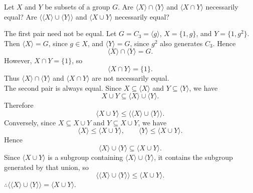\documentclass[../Odyssey_Project.tex]{subfiles}
\begin{document}
\begin{exercise}
\label{ex:1.6}
Let $X$ and $Y$ be subsets of a group $G$. Are $\langle X \rangle \cap \langle Y \rangle$ and $\langle X \cap Y \rangle$ necessarily equal? Are $\langle \langle X \rangle \cup \langle Y \rangle \rangle$ and $\langle X \cup Y \rangle$ necessarily equal?
\end{exercise}
\begin{solution}
The first pair need not be equal. Let \(G = C_3 = \langle g \rangle\), \(X = \{1,g\}\), and \(Y = \{1,g^2\}\). Then \(\langle X\rangle = G\), since \(g \in X\), and \(\langle Y\rangle = G\), since \(g^2\) also generates \(C_3\). Hence
\[
    \langle X\rangle \cap \langle Y\rangle = G.
\]
However, \(X \cap Y = \{1\}\), so
\[
    \langle X \cap Y\rangle = \{1\}.
\]
Thus \(\langle X\rangle \cap \langle Y\rangle\) and \(\langle X \cap Y\rangle\) are not necessarily equal. \\
The second pair is always equal. Since \(X \subseteq \langle X\rangle\) and \(Y \subseteq \langle Y\rangle\), we have
\[
    X \cup Y \subseteq \langle X\rangle \cup \langle Y\rangle.
\]
Therefore
\[
    \langle X \cup Y\rangle \leq \langle \langle X\rangle \cup \langle Y\rangle\rangle.
\]
Conversely, since \(X \subseteq X \cup Y\) and \(Y \subseteq X \cup Y\), we have
\[
    \langle X\rangle \leq \langle X \cup Y\rangle,
    \qquad
    \langle Y\rangle \leq \langle X \cup Y\rangle.
\]
Hence
\[
    \langle X\rangle \cup \langle Y\rangle \subseteq \langle X \cup Y\rangle.
\]
Since \(\langle X \cup Y\rangle\) is a subgroup containing \(\langle X\rangle \cup \langle Y\rangle\), it contains the subgroup generated by that union, so
\[
    \langle \langle X\rangle \cup \langle Y\rangle\rangle \leq \langle X \cup Y\rangle.
\]
\(\therefore \langle \langle X\rangle \cup \langle Y\rangle\rangle = \langle X \cup Y\rangle\).
\end{solution}
\end{document}
